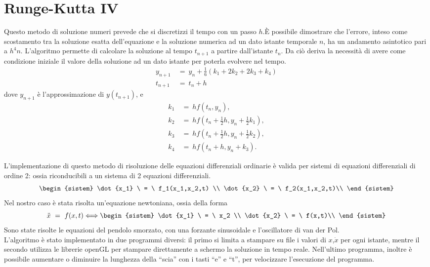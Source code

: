 \section{Runge-Kutta IV}
Questo metodo di soluzione numeri prevede che si discretizzi il tempo con un passo $h$.È possibile dimostrare che l'errore,
inteso come scostamento tra la soluzione esatta dell'equazione e la soluzione numerica ad un dato istante temporale $n$, ha un andamento asintotico
pari a $h^4 n$.
L'algoritmo permette di calcolare la soluzione al tempo $t_{n+1}$ a partire dall'istante $t_n$. Da ciò deriva la necessità di avere come condizione
iniziale il valore della soluzione ad un dato istante per poterla evolvere nel tempo.
\begin{align}
y_{n+1} \ &= \ y_n + \tfrac{1}{6} \left(k_1 + 2k_2 + 2k_3 + k_4 \right)\\
t_{n+1} \ &= \ t_n + h
\end{align}
dove $y_{n+1}$ è l'approssimazione di $y(t_{n+1})$, e
\begin{align}
k_1 \ &= \ hf(t_n, y_n),\\
k_2 \ &= \ hf(t_n + \tfrac{1}{2}h , y_n + \tfrac{1}{2} k_1),\\
k_3 \ &= \ hf(t_n + \tfrac{1}{2}h , y_n + \tfrac{1}{2} k_2),\\
k_4 \ &= \ hf(t_n + h , y_n + k_3).
\end{align}



L'implementazione di questo metodo di risoluzione delle equazioni differenziali ordinarie è valida
per sistemi di equazioni differenziali di ordine 2: ossia riconducibili a un sistema di 2 equazioni differenziali.\\
$$\begin{sistem}
	\dot{x_1} \ = \ f_1(x_1,x_2,t) \\
	\dot{x_2} \ = \ f_2(x_1,x_2,t)\\
  \end{sistem}
$$
Nel nostro caso è stata risolta un'equazione newtoniana, ossia della forma
$$
	\ddot{x} \ = \ f(x,t) \Longleftrightarrow  
	\begin{sistem}
	\dot{x_1} \ = \ x_2 \\
	\dot{x_2} \ = \ f(x,t)\\
	\end{sistem}
$$
Sono state risolte le equazioni del pendolo smorzato, con una forzante sinusoidale e l'oscillatore di van der Pol.\\
L'algoritmo è stato implementato in due programmi diversi: il primo si limita a stampare su file i valori di $x$,$\dot x$ per ogni istante, mentre
il secondo utilizza le librerie openGL per stampare direttamente a schermo la soluzione in tempo reale.
Nell'ultimo programma, inoltre è possibile aumentare o diminuire la lunghezza della ``scia'' con i tasti ``e'' e ``t'', per velocizzare l'esecuzione del programma.
